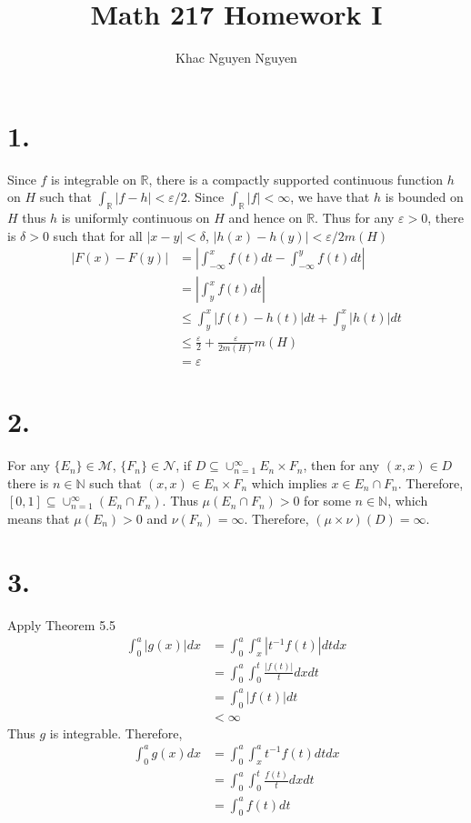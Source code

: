 \documentclass[11pt]{article}
\title{\textbf{Math 217 Homework I}}
\author{Khac Nguyen Nguyen}
\date{}
\theoremstyle{mystyle}
\theoremstyle{definition}
\begin{document}
\section*{1.}
Since $f$ is integrable on $\mathbb{R}$, there is a compactly supported continuous function $h$ on $H$ such that $\int_\mathbb{R} |f-h|< \varepsilon/2$. Since $\int_{\mathbb{R}} |f| < \infty$, we have that $h$ is bounded on $H$ thus $h$ is uniformly continuous on $H$ and hence on $\mathbb{R}$. Thus for any $\varepsilon > 0$, there is $\delta > 0$ such that for all $|x-y|< \delta$, $|h(x)-h(y)| < \varepsilon/2m(H)$   
\begin{align*}
  |F(x) - F(y)|  
  &= \left|\int_{-\infty}^x f(t) dt - \int_{-\infty}^y f(t) dt \right| \\
  &= \left|\int_y^x f(t) dt \right| \\
  &\le \int_y^x |f(t) - h(t)| dt + \int_y^x |h(t)| dt \\
  &\le \displaystyle\frac{\varepsilon}{2} + \displaystyle\frac{\varepsilon}{2m(H)} m(H) \\
  &= \varepsilon
\end{align*}
\newpage
\section*{2.}
For any $\{E_n\} \in \mathcal{M}$, $\{F_n\} \in \mathcal{N}$, if $D \subseteq \cup_{n=1}^\infty E_n \times F_n$, then for any $(x,x) \in D$ there is $n \in \mathbb{N}$ such that $(x,x) \in E_n \times F_n$ which implies $x \in E_n \cap F_n$. Therefore, $[0,1] \subseteq \cup_{n=1}^\infty (E_n \cap F_n)$. Thus $\mu(E_n \cap F_n) > 0$ for some $n \in \mathbb{N}$, which means that $\mu(E_n) > 0$ and $\nu(F_n) = \infty$. Therefore, $(\mu \times \nu)(D) = \infty$.
\newpage
\section*{3.}
Apply Theorem 5.5
\begin{align*}
  \int_0^a |g(x)| dx 
  &= \int_0^a \int_x^a |t^{-1}f(t)| dt dx \\ 
  &= \int_0^a \int_0^t \displaystyle\frac{|f(t)|}{t} dx dt \\
  &= \int_0^a |f(t)| dt \\
  &< \infty
\end{align*}
Thus $g$ is integrable. Therefore, 
\begin{align*}
  \int_0^a g(x) dx 
  &= \int_0^a \int_x^a t^{-1}f(t) dt dx \\ 
  &= \int_0^a \int_0^t \displaystyle\frac{f(t)}{t} dx dt \\
  &= \int_0^a f(t) dt \\
\end{align*}
\newpage
\end{document}
